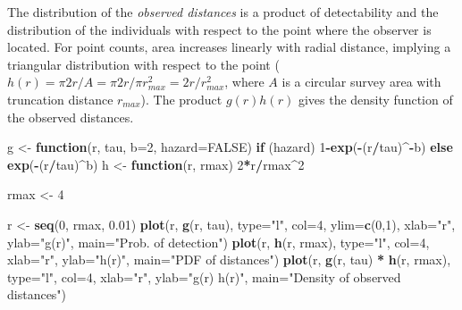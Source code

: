 \documentclass[12pt,]{book}
\newenvironment{Shaded}{\begin{snugshade}}{\end{snugshade}}
\newcommand{\ControlFlowTok}[1]{\textcolor[rgb]{0.13,0.29,0.53}{\textbf{#1}}}
\newcommand{\DataTypeTok}[1]{\textcolor[rgb]{0.13,0.29,0.53}{#1}}
\newcommand{\DecValTok}[1]{\textcolor[rgb]{0.00,0.00,0.81}{#1}}
\newcommand{\FloatTok}[1]{\textcolor[rgb]{0.00,0.00,0.81}{#1}}
\newcommand{\KeywordTok}[1]{\textcolor[rgb]{0.13,0.29,0.53}{\textbf{#1}}}
\newcommand{\NormalTok}[1]{#1}
\newcommand{\OperatorTok}[1]{\textcolor[rgb]{0.81,0.36,0.00}{\textbf{#1}}}
\newcommand{\OtherTok}[1]{\textcolor[rgb]{0.56,0.35,0.01}{#1}}
\newcommand{\StringTok}[1]{\textcolor[rgb]{0.31,0.60,0.02}{#1}}
\begin{document}
The distribution of the \emph{observed distances} is a product of detectability
and the distribution of the individuals with respect to the point where
the observer is located.
For point counts, area increases linearly with radial distance,
implying a triangular distribution with respect to the point
(\(h(r)=\pi 2 r /A=\pi 2 r / \pi r_{max}^2=2 r / r_{max}^2\), where
\(A\) is a circular survey area with truncation distance \(r_{max}\)).
The product \(g(r) h(r)\) gives the density function of the observed distances.

\begin{Shaded}
\begin{Highlighting}[]
\NormalTok{g <-}\StringTok{ }\ControlFlowTok{function}\NormalTok{(r, tau, }\DataTypeTok{b=}\DecValTok{2}\NormalTok{, }\DataTypeTok{hazard=}\OtherTok{FALSE}\NormalTok{)}
  \ControlFlowTok{if}\NormalTok{ (hazard)}
    \DecValTok{1}\OperatorTok{-}\KeywordTok{exp}\NormalTok{(}\OperatorTok{-}\NormalTok{(r}\OperatorTok{/}\NormalTok{tau)}\OperatorTok{^-}\NormalTok{b) }\ControlFlowTok{else} \KeywordTok{exp}\NormalTok{(}\OperatorTok{-}\NormalTok{(r}\OperatorTok{/}\NormalTok{tau)}\OperatorTok{^}\NormalTok{b)}
\NormalTok{h <-}\StringTok{ }\ControlFlowTok{function}\NormalTok{(r, rmax)}
  \DecValTok{2}\OperatorTok{*}\NormalTok{r}\OperatorTok{/}\NormalTok{rmax}\OperatorTok{^}\DecValTok{2}
\end{Highlighting}
\end{Shaded}

\begin{Shaded}
\begin{Highlighting}[]
\NormalTok{rmax <-}\StringTok{ }\DecValTok{4}

\NormalTok{r <-}\StringTok{ }\KeywordTok{seq}\NormalTok{(}\DecValTok{0}\NormalTok{, rmax, }\FloatTok{0.01}\NormalTok{)}
\KeywordTok{plot}\NormalTok{(r, }\KeywordTok{g}\NormalTok{(r, tau), }\DataTypeTok{type=}\StringTok{"l"}\NormalTok{, }\DataTypeTok{col=}\DecValTok{4}\NormalTok{, }\DataTypeTok{ylim=}\KeywordTok{c}\NormalTok{(}\DecValTok{0}\NormalTok{,}\DecValTok{1}\NormalTok{),}
  \DataTypeTok{xlab=}\StringTok{"r"}\NormalTok{, }\DataTypeTok{ylab=}\StringTok{"g(r)"}\NormalTok{, }\DataTypeTok{main=}\StringTok{"Prob. of detection"}\NormalTok{)}
\KeywordTok{plot}\NormalTok{(r, }\KeywordTok{h}\NormalTok{(r, rmax), }\DataTypeTok{type=}\StringTok{"l"}\NormalTok{, }\DataTypeTok{col=}\DecValTok{4}\NormalTok{,}
  \DataTypeTok{xlab=}\StringTok{"r"}\NormalTok{, }\DataTypeTok{ylab=}\StringTok{"h(r)"}\NormalTok{, }\DataTypeTok{main=}\StringTok{"PDF of distances"}\NormalTok{)}
\KeywordTok{plot}\NormalTok{(r, }\KeywordTok{g}\NormalTok{(r, tau) }\OperatorTok{*}\StringTok{ }\KeywordTok{h}\NormalTok{(r, rmax), }\DataTypeTok{type=}\StringTok{"l"}\NormalTok{, }\DataTypeTok{col=}\DecValTok{4}\NormalTok{,}
  \DataTypeTok{xlab=}\StringTok{"r"}\NormalTok{, }\DataTypeTok{ylab=}\StringTok{"g(r) h(r)"}\NormalTok{, }\DataTypeTok{main=}\StringTok{"Density of observed distances"}\NormalTok{)}
\end{Highlighting}
\end{Shaded}
\end{document}

